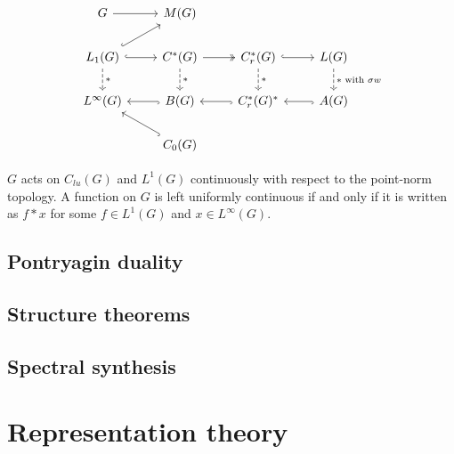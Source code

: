 \documentclass{../../large}
\begin{document}
\[\begin{tikzcd}
G \ar{r} & M(G) & \, & \,\\
L_1(G) \ar[hook]{ur}\ar[hook]{r}\ar[dashed]{d}{*} & C^*(G) \ar[two heads]{r}\ar[dashed]{d}{*} & C_r^*(G) \ar[hook]{r}\ar[dashed]{d}{*} & L(G) \ar[dashed]{d}{*\text{ with }\sigma w}\\
L^\infty(G) & B(G) \ar[hook]{l} & C_r^*(G)^* \ar[hook]{l} & A(G) \ar[hook]{l}\\
& C_0(G) \ar[hook]{ul} & &
\end{tikzcd}\]


\begin{prb}
$G$ acts on $C_{lu}(G)$ and $L^1(G)$ continuously with respect to the point-norm topology.
A function on $G$ is left uniformly continuous if and only if it is written as $f*x$ for some $f\in L^1(G)$ and $x\in L^\infty(G)$.
\end{prb}



\section{Pontryagin duality}

\begin{prb}
\end{prb}
\begin{prb}
\end{prb}
\begin{prb}
\end{prb}


\section{Structure theorems}



\section{Spectral synthesis}








\chapter{Representation theory}

\begin{prb}
\end{prb}
\end{document}
